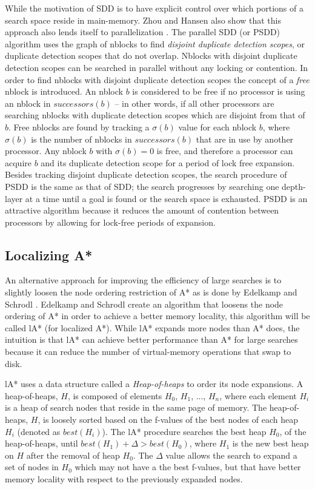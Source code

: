\documentclass{article} \usepackage{aaai} \usepackage{graphicx}
\begin{document}
While the motivation of SDD is to have explicit control over which
portions of a search space reside in main-memory.  Zhou and Hansen
also show that this approach also lends itself to parallelization
\cite{zhou:psd}.  The parallel SDD (or PSDD) algorithm uses the graph
of nblocks to find \emph{disjoint duplicate detection scopes}, or
duplicate detection scopes that do not overlap.  Nblocks with disjoint
duplicate detection scopes can be searched in parallel without any
locking or contention.  In order to find nblocks with disjoint
duplicate detection scopes the concept of a \emph{free} nblock is
introduced.  An nblock $b$ is considered to be free if no processor is
using an nblock in $successors(b)$ -- in other words, if all other
processors are searching nblocks with duplicate detection scopes which
are disjoint from that of $b$.  Free nblocks are found by tracking a
$\sigma(b)$ value for each nblock $b$, where $\sigma(b)$ is the number
of nblocks in $successors(b)$ that are in use by another processor.
Any nblock $b$ with $\sigma(b) = 0$ is free, and therefore a processor
can acquire $b$ and its duplicate detection scope for a period of lock
free expansion.  Besides tracking disjoint duplicate detection scopes,
the search procedure of PSDD is the same as that of SDD; the search
progresses by searching one depth-layer at a time until a goal is
found or the search space is exhausted.  PSDD is an attractive
algorithm because it reduces the amount of contention between
processors by allowing for lock-free periods of expansion.

\subsection{Localizing A*}

An alternative approach for improving the efficiency of large searches
is to slightly loosen the node ordering restriction of A* as is done
by Edelkamp and Schrodl \cite{edelkamp:loc}.  Edelkamp and Schrodl
create an algorithm that loosens the node ordering of A* in order to
achieve a better memory locality, this algorithm will be called lA*
(for localized A*).  While lA* expands more nodes than A* does, the
intuition is that lA* can achieve better performance than A* for large
searches because it can reduce the number of virtual-memory operations
that swap to disk.

lA* uses a data structure called a \emph{Heap-of-heaps} to order its
node expansions.  A heap-of-heaps, $H$, is composed of elements $H_0$,
$H_1$, ..., $H_n$, where each element $H_i$ is a heap of search nodes
that reside in the same page of memory.  The heap-of-heaps, $H$, is
loosely sorted based on the f-values of the best nodes of each heap
$H_i$ (denoted as $best(H_i)$).  The lA* procedure searches the best
heap $H_0$, of the heap-of-heaps, until $best(H_1) + \Delta >
best(H_0)$, where $H_1$ is the new best heap on $H$ after the removal
of heap $H_0$.  The $\Delta$ value allows the search to expand a set
of nodes in $H_0$ which may not have a the best f-values, but that
have better memory locality with respect to the previously expanded
nodes.
\end{document}
